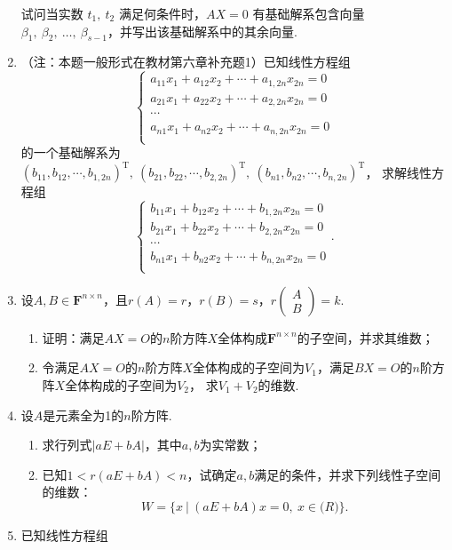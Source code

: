\begin{enumerate}
    试问当实数 $t_1,\ t_2$ 满足何条件时，$AX=0$ 有基础解系包含向量 $\beta_1,\ \beta_2,\ \dots,\ \beta_{s-1}$，并写出该基础解系中的其余向量.
    \item （注：本题一般形式在教材第六章补充题1）已知线性方程组$$\begin{cases}
        a_{11}x_1+a_{12}x_2+\cdots+a_{1,2n}x_{2n}=0 \\
        a_{21}x_1+a_{22}x_2+\cdots+a_{2,2n}x_{2n}=0 \\
        \cdots \\
        a_{n1}x_1+a_{n2}x_2+\cdots+a_{n,2n}x_{2n}=0 \\
    \end{cases}$$
    的一个基础解系为$(b_{11},b_{12},\cdots,b_{1,2n})^\mathrm{T},\ (b_{21},b_{22},\cdots,b_{2,2n})^\mathrm{T},\ (b_{n1},b_{n2},\cdots,b_{n,2n})^\mathrm{T}$，
    求解线性方程组$$\begin{cases}
        b_{11}x_1+b_{12}x_2+\cdots+b_{1,2n}x_{2n}=0 \\
        b_{21}x_1+b_{22}x_2+\cdots+b_{2,2n}x_{2n}=0 \\
        \cdots \\
        b_{n1}x_1+b_{n2}x_2+\cdots+b_{n,2n}x_{2n}=0 \\
    \end{cases}.$$
    \item 设$A,B\in \mathbf{F}^{n\times n}$，且$r(A)=r$，$r(B)=s$，$r\begin{pmatrix}
        A \\ B
    \end{pmatrix}=k$.
    \begin{enumerate}[label=(\arabic*)]
        \item 证明：满足$AX=O$的$n$阶方阵$X$全体构成$\mathbf{F}^{n\times n}$的子空间，并求其维数；
        \item 令满足$AX=O$的$n$阶方阵$X$全体构成的子空间为$V_1$，满足$BX=O$的$n$阶方阵$X$全体构成的子空间为$V_2$，
        求$V_1+V_2$的维数.
    \end{enumerate}
    \item 设$A$是元素全为1的$n$阶方阵.
    \begin{enumerate}
        \item 求行列式$|aE+bA|$，其中$a,b$为实常数；
        \item 已知$1<r(aE+bA)<n$，试确定$a,b$满足的条件，并求下列线性子空间的维数：
        \[W=\{x\ |\ (aE+bA)x=0,\ x\in\mathbf(R)\}.\]
    \end{enumerate}
    \item 已知线性方程组

\end{enumerate}
